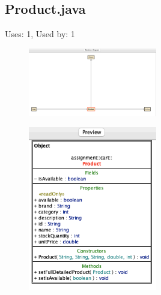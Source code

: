 \documentclass{article}
\begin{document}
\subsection{Product.java}
Uses: 1, Used by: 1
\begin{figure}[H]
    \centering
    \includegraphics[width=0.5\textwidth]{img/productDiagram.png}
\end{figure}
\begin{figure}[H]
    \centering
    \includegraphics[width=0.5\textwidth]{img/productPreview.png}
\end{figure}
\end{document}
